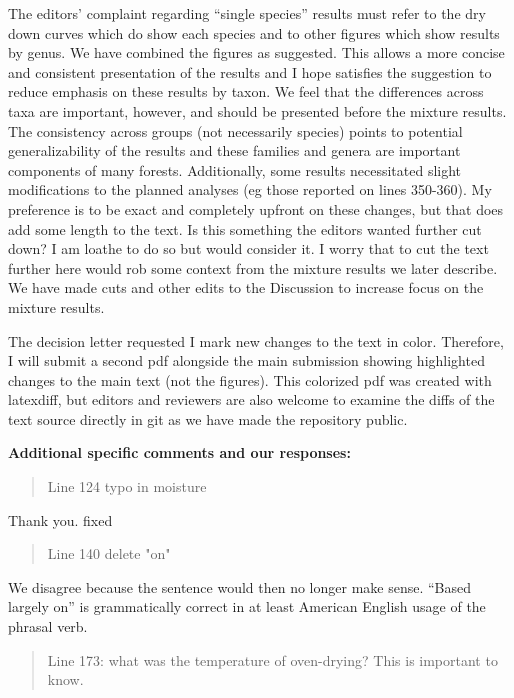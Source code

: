 \documentclass[letterpaper, 12pt]{letter}
\begin{document}
\begin{letter}{}
The editors' complaint regarding ``single species'' results must refer to the
dry down curves which do show each species and to other figures which show
results by genus. We have combined the figures as suggested. This allows a more
concise and consistent presentation of the results and I hope satisfies the
suggestion to reduce emphasis on these results by taxon. We feel that the
differences across taxa are important, however, and should be presented before
the mixture results. The consistency across groups (not necessarily species)
points to potential generalizability of the results and these families and
genera are important components of many forests. Additionally, some results
necessitated slight modifications to the planned analyses (eg those reported on
lines 350-360). My preference is to be exact and completely upfront on these
changes, but that does add some length to the text. Is this something the
editors wanted further cut down? I am loathe to do so but would consider it. I
worry that to cut the text further here would rob some context from the mixture
results we later describe. We have made cuts and other edits to the Discussion
to increase focus on the mixture results.

The decision letter requested I mark new changes to the text in color.
Therefore, I will submit a second pdf alongside the main submission showing
highlighted changes to the main text (not the figures). This colorized pdf was
created with latexdiff, but editors and reviewers are also welcome to examine
the diffs of the text source directly in git as we have made the repository
public.


{\bf Additional specific comments and our responses:}

\begin{quote}
  Line 124 typo in moisture
\end{quote}

Thank you. fixed

\begin{quote}
  Line 140 delete "on"
\end{quote}

We disagree because the sentence would then no longer make sense. ``Based
largely on'' is grammatically correct in at least American English usage of the
phrasal verb.

\begin{quote}
  Line 173: what was the temperature of oven-drying? This is important to know.
\end{quote}


\end{letter}
\end{document}
